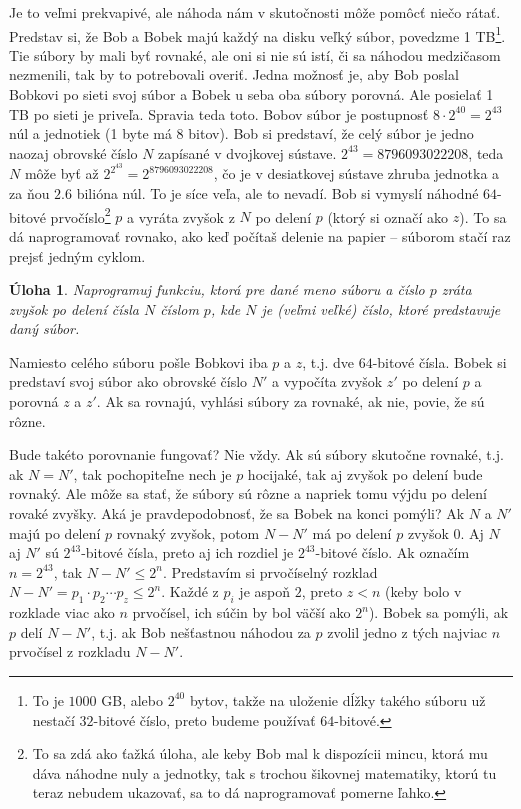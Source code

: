 \documentclass[10pt]{article}
\def\ods{\vspace*{10pt}}
\newtheorem{uloha}{Úloha}
\begin{document}
{\ods
Je to veľmi prekvapivé, ale náhoda nám v skutočnosti môže pomôcť niečo rátať. 
Predstav si, že Bob a Bobek majú každý na disku veľký súbor, povedzme 1 
TB\footnote{To je $1000$ GB, alebo $2^{40}$ bytov, 
takže na uloženie dĺžky takého súboru už nestačí $32$-bitové číslo,
preto budeme používať $64$-bitové.}.
Tie súbory by mali byť rovnaké, ale oni si nie sú istí, či sa náhodou medzičasom nezmenili,
tak by to potrebovali overiť. Jedna možnosť je, aby Bob poslal Bobkovi po sieti 
svoj súbor a Bobek u seba oba súbory porovná. Ale posielať 1 TB po sieti je priveľa. 
Spravia teda toto. 
Bobov súbor je postupnosť $8\cdot2^{40}=2^{43}$ núl a jednotiek (1 byte má 8 bitov).
Bob si predstaví, že celý súbor je jedno naozaj obrovské číslo $N$
zapísané v dvojkovej sústave.
$2^{43}=8796093022208$, teda $N$ môže byť až
$2^{2^{43}}=2^{8796093022208}$, čo je v desiatkovej sústave
zhruba jednotka a za ňou $2.6$ bilióna núl. 
To je síce veľa, ale to nevadí.
Bob si vymyslí náhodné $64$-bitové prvočíslo\footnote{To sa
zdá ako ťažká úloha, ale keby Bob mal k dispozícii mincu, ktorá mu dáva náhodne nuly
a jednotky, tak s trochou šikovnej matematiky, ktorú tu teraz nebudem ukazovať,
sa to dá naprogramovať pomerne ľahko.} $p$ a vyráta zvyšok z $N$ po delení $p$ (ktorý si
označí ako $z$).
To sa dá naprogramovať rovnako, ako keď počítaš delenie na papier -- súborom stačí 
raz prejsť jedným cyklom.

\begin{uloha}
  Naprogramuj funkciu, ktorá pre dané meno súboru a číslo $p$ zráta zvyšok po delení
  čísla $N$ číslom $p$, kde $N$ je (veľmi veľké) číslo, ktoré predstavuje daný súbor.
\end{uloha}

Namiesto celého súboru pošle Bobkovi iba $p$ a $z$, t.j. dve $64$-bitové čísla. 
Bobek si predstaví svoj súbor ako obrovské číslo $N'$ a
vypočíta  zvyšok $z'$ po delení $p$ a porovná $z$ a $z'$.
Ak sa rovnajú, vyhlási súbory za rovnaké, ak nie, povie, že sú rôzne. 

\ods
Bude takéto porovnanie fungovať? Nie vždy. Ak sú súbory skutočne rovnaké, t.j.
ak $N=N'$, tak pochopiteľne nech je $p$ hocijaké, tak aj zvyšok po delení bude rovnaký.
Ale môže sa stať, že súbory sú rôzne a napriek tomu výjdu po delení rovaké zvyšky.
Aká je pravdepodobnosť, že sa Bobek na konci pomýli?
Ak $N$ a $N'$ majú po delení $p$ rovnaký zvyšok, potom $N-N'$ má po delení $p$ zvyšok $0$.
Aj $N$ aj $N'$ sú $2^{43}$-bitové čísla, preto aj ich rozdiel je $2^{43}$-bitové číslo.
Ak označím $n=2^{43}$, tak $N-N'\le 2^n$. Predstavím si prvočíselný rozklad 
$N-N'=p_1\cdot p_2\cdots p_z\le 2^n$. Každé z $p_i$
je aspoň $2$, preto $z<n$ (keby bolo v rozklade viac ako $n$ prvočísel, ich súčin
by bol väčší ako $2^n$). Bobek sa pomýli, ak $p$ delí $N-N'$, t.j. ak
Bob nešťastnou náhodou za $p$
zvolil jedno z tých najviac $n$ prvočísel z rozkladu $N-N'$. 

}
\end{document}
